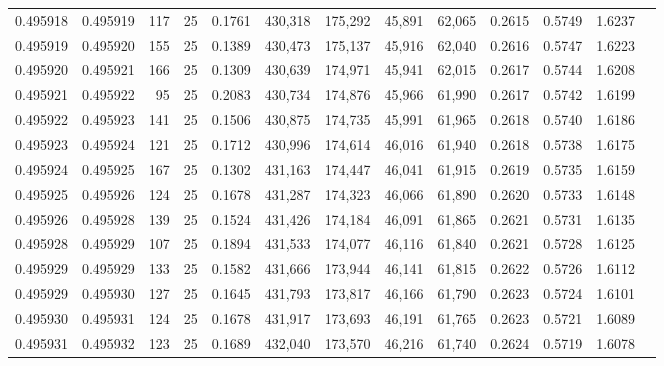 \begin{tabular}{rrrrrrrrrrrrr}
0.495918 & 0.495919 &   117 &  25 &                                     0.1761 & 430,318 & 175,292 &  45,891 &  62,065 & 0.2615 & 0.5749 & 1.6237 \\
0.495919 & 0.495920 &   155 &  25 &                                     0.1389 & 430,473 & 175,137 &  45,916 &  62,040 & 0.2616 & 0.5747 & 1.6223 \\
0.495920 & 0.495921 &   166 &  25 &                                     0.1309 & 430,639 & 174,971 &  45,941 &  62,015 & 0.2617 & 0.5744 & 1.6208 \\
0.495921 & 0.495922 &    95 &  25 &                                     0.2083 & 430,734 & 174,876 &  45,966 &  61,990 & 0.2617 & 0.5742 & 1.6199 \\
0.495922 & 0.495923 &   141 &  25 &                                     0.1506 & 430,875 & 174,735 &  45,991 &  61,965 & 0.2618 & 0.5740 & 1.6186 \\
0.495923 & 0.495924 &   121 &  25 &                                     0.1712 & 430,996 & 174,614 &  46,016 &  61,940 & 0.2618 & 0.5738 & 1.6175 \\
0.495924 & 0.495925 &   167 &  25 &                                     0.1302 & 431,163 & 174,447 &  46,041 &  61,915 & 0.2619 & 0.5735 & 1.6159 \\
0.495925 & 0.495926 &   124 &  25 &                                     0.1678 & 431,287 & 174,323 &  46,066 &  61,890 & 0.2620 & 0.5733 & 1.6148 \\
0.495926 & 0.495928 &   139 &  25 &                                     0.1524 & 431,426 & 174,184 &  46,091 &  61,865 & 0.2621 & 0.5731 & 1.6135 \\
0.495928 & 0.495929 &   107 &  25 &                                     0.1894 & 431,533 & 174,077 &  46,116 &  61,840 & 0.2621 & 0.5728 & 1.6125 \\
0.495929 & 0.495929 &   133 &  25 &                                     0.1582 & 431,666 & 173,944 &  46,141 &  61,815 & 0.2622 & 0.5726 & 1.6112 \\
0.495929 & 0.495930 &   127 &  25 &                                     0.1645 & 431,793 & 173,817 &  46,166 &  61,790 & 0.2623 & 0.5724 & 1.6101 \\
0.495930 & 0.495931 &   124 &  25 &                                     0.1678 & 431,917 & 173,693 &  46,191 &  61,765 & 0.2623 & 0.5721 & 1.6089 \\
0.495931 & 0.495932 &   123 &  25 &                                     0.1689 & 432,040 & 173,570 &  46,216 &  61,740 & 0.2624 & 0.5719 & 1.6078 \\

\end{tabular}
